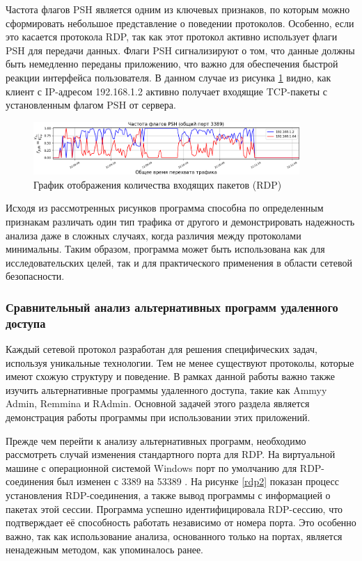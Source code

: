 \documentclass[bachelor, och, coursework]{SCWorks}
\begin{document}
Частота флагов PSH является одним из ключевых признаков, по которым можно сформировать небольшое представление о поведении протоколов. Особенно, если это касается
протокола RDP, так как этот протокол активно использует флаги PSH для передачи данных. Флаги PSH сигнализируют о том, что данные должны быть немедленно 
переданы приложению, что важно для обеспечения быстрой реакции интерфейса пользователя. В данном случае из рисунка \ref{rdpg2} видно, как клиент с IP-адресом 192.168.1.2
активно получает входящие TCP-пакеты с установленным флагом PSH от сервера.

\begin{figure}[H]
  \centering
  \includegraphics[width=0.9\textwidth]{pics/newrdp2.png}
  \caption{График отображения количества входящих пакетов (RDP)}
  \label{rdpg2}
\end{figure}



Исходя из рассмотренных рисунков программа способна по определенным признакам различать один тип трафика от другого и демонстрировать 
надежность анализа даже в сложных случаях, когда различия между протоколами минимальны. Таким образом, программа может быть использована 
как для исследовательских целей, так и для практического применения в области сетевой безопасности.

\subsubsection{Сравнительный анализ альтернативных программ удаленного доступа}

Каждый сетевой протокол разработан для решения специфических задач, используя уникальные технологии. Тем не 
менее существуют протоколы, которые имеют схожую структуру и поведение. В рамках данной работы важно также 
изучить альтернативные программы удаленного доступа, такие как Ammyy Admin, Remmina и RAdmin. Основной задачей 
этого раздела является демонстрация работы программы при использовании этих приложений.

Прежде чем перейти к анализу альтернативных программ, необходимо рассмотреть случай изменения стандартного порта для RDP. На виртуальной машине с 
операционной системой Windows порт по умолчанию для RDP-соединения был изменен с 3389 на 53389 \cite{rdpport}. На рисунке \ref{rdp2} показан процесс 
установления RDP-соединения, а также вывод программы с информацией о пакетах этой сессии. Программа успешно идентифицировала RDP-сессию, 
что подтверждает её способность работать независимо от номера порта. Это особенно важно, так как использование анализа, основанного только 
на портах, является ненадежным методом, как упоминалось ранее.
\end{document}
